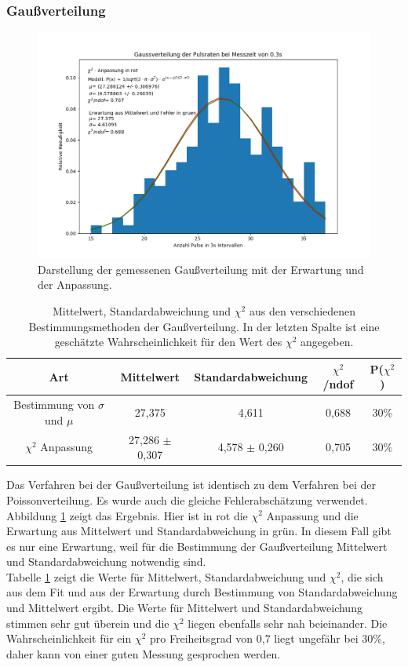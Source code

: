 \documentclass[12pt,a4paper]{article}
\begin{document}
\subsubsection{Gaußverteilung}
\begin{figure}
\centering
\includegraphics[scale=0.8]{Bilder/gauss.PNG}
\caption{Darstellung der gemessenen Gaußverteilung mit der Erwartung und der Anpassung.}
\label{fig:gauss}
\end{figure}

\begin{table}
\centering
\begin{tabular}{|c|c|c|c|c|}
\hline 
Art & Mittelwert & Standardabweichung & $\chi ^2$ /ndof & P($\chi ^2$) \\ 
\hline 
Bestimmung von $\sigma$ und $\mu$ & 27,375 & 4,611 & 0,688 & 30\% \\ 
\hline 
$\chi ^2$ Anpassung & 27,286 $\pm$ 0,307 & 4,578 $\pm$ 0,260 & 0,705 & 30\% \\ 
\hline 
\end{tabular} 
\caption{Mittelwert, Standardabweichung und $\chi ^2$ aus den verschiedenen Bestimmungsmethoden der Gaußverteilung. In der letzten Spalte ist eine geschätzte Wahrscheinlichkeit für den Wert des $\chi ^2$ angegeben.}
\label{tab:Gauss}
\end{table}

Das Verfahren bei der Gaußverteilung ist identisch zu dem Verfahren bei der Poissonverteilung. Es wurde auch die gleiche Fehlerabschätzung verwendet. Abbildung \ref{fig:gauss} zeigt das Ergebnis. Hier ist in rot die $\chi ^2$ Anpassung und die Erwartung aus Mittelwert und Standardabweichung in grün. In diesem Fall gibt es nur eine Erwartung, weil für die Bestimmung der Gaußverteilung Mittelwert und Standardabweichung notwendig sind.\\
Tabelle \ref{tab:Gauss} zeigt die Werte für Mittelwert, Standardabweichung und $\chi ^2$, die sich aus dem Fit und aus der Erwartung durch Bestimmung von Standardabweichung und Mittelwert ergibt. Die Werte für Mittelwert und Standardabweichung stimmen sehr gut überein und die $\chi ^2$ liegen ebenfalls sehr nah beieinander. Die Wahrscheinlichkeit für ein $\chi ^2$ pro Freiheitsgrad von 0,7 liegt ungefähr bei 30\%, daher kann von einer guten Messung gesprochen werden.
\end{document}
